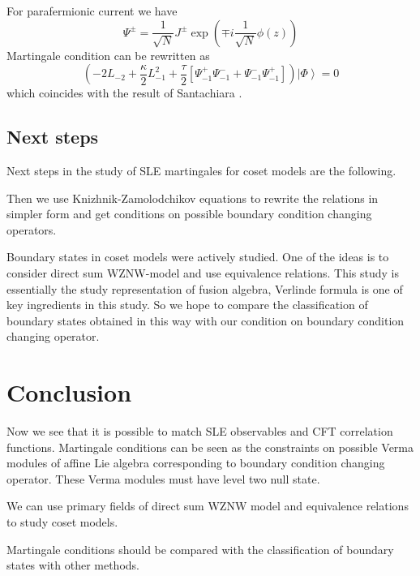 \documentclass[12pt]{article}
\theoremstyle{definition}
\newcommand{\gf}{\mathfrak{g}}
\newcommand{\af}{\mathfrak{a}}
\theoremstyle{definition} \newtheorem{Def}{Definition}
\begin{document}
For parafermionic current we have
\begin{equation*}
  \Psi^{\pm}=\frac{1}{\sqrt{N}} J^{\pm}\exp\left(\mp i \frac{1}{\sqrt{N}}\phi(z)\right)
\end{equation*}
Martingale condition can be rewritten as
\begin{equation*}
  \left(-2 L_{-2}+\frac{\kappa}{2}L_{-1}^{2}+\frac{\tau}{2}\left[\Psi^{+}_{-1}\Psi^{-}_{-1}+\Psi^{-}_{-1}\Psi^{+}_{-1}\right]\right) \left|\Phi\right>=0
\end{equation*}
which coincides with the result of Santachiara \cite{santachiara2008sle}.



\subsection{Next steps}

Next steps in the study of SLE martingales for coset models  are the following. 


Then we use Knizhnik-Zamolodchikov equations to rewrite the relations in simpler form and get conditions on possible boundary condition changing operators. 

Boundary states in coset models were actively studied. One of the ideas is to consider direct sum WZNW-model and use equivalence relations. This study is essentially the study representation of fusion algebra, Verlinde formula is one of key ingredients in this study. So we hope to compare the classification of boundary states obtained in this way with our condition on boundary condition changing operator. 

\section{Conclusion}
\label{sec:conclusion}

Now we see that it is possible to match SLE observables and CFT correlation functions. Martingale conditions can be seen as the constraints on possible Verma modules of affine Lie algebra corresponding to boundary condition changing operator. These Verma modules must have level two null state. 

We can use primary fields of direct sum WZNW model and equivalence relations to study coset models. 

Martingale conditions should be compared with the classification of boundary states with other methods.

{}

\end{document}

